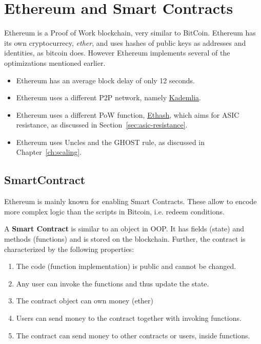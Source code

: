 
\section{Ethereum and Smart Contracts}

\noindent
Ethereum is a Proof of Work blockchain, very similar to BitCoin.
Ethereum has its own cryptocurrecy, \emph{ether}, and uses hashes of public keys as addresses and identities, as bitcoin does.
However Ethereum implements several of the optimizations mentioned earlier.

\begin{itemize}
	\item Ethereum has an average block delay of only 12 seconds.
	\item Ethereum uses a different P2P network, namely \href{https://pdos.csail.mit.edu/~petar/papers/maymounkov-kademlia-lncs.pdf}{Kademlia}.
	\item Ethereum uses a different PoW function,  \href{https://eth.wiki/concepts/ethash/design-rationale}{Ethash}, which aims for ASIC resistance, as discussed in Section~\ref{sec:asic-resistance}.
	\item Ethereum uses Uncles and the GHOST rule, as discussed in Chapter~\ref{ch:scaling}.
\end{itemize}

\subsection{SmartContract}
Ethereum is mainly known for enabling Smart Contracts. 
These allow to encode more complex logic than the scripts in Bitcoin, i.e. redeem conditions.

\begin{definition} A \textbf{Smart Contract} is similar to an object in OOP. 
It has fields (state) and methods (functions) and is stored on the blockchain.
Further, the contract is characterized by the following properties:
\begin{enumerate}
	\item The code (function implementation) is public and cannot be changed.
	\item Any user can invoke the functions and thus update the state.
	\item The contract object can own money (ether)
	\item Users can send money to the contract together with invoking functions.
	\item The contract can send money to other contracts or users, inside functions.
\end{enumerate}
\end{definition}

